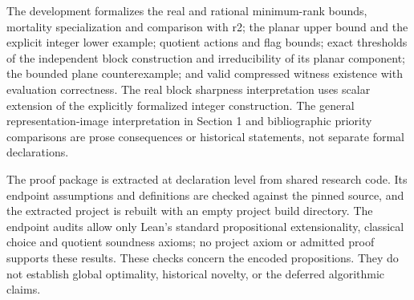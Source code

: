 The development formalizes the real and rational minimum-rank bounds, mortality specialization and comparison with r2; the planar upper bound and the explicit integer lower example; quotient actions and flag bounds; exact thresholds of the independent block construction and irreducibility of its planar component; the bounded plane counterexample; and valid compressed witness existence with evaluation correctness. The real block sharpness interpretation uses scalar extension of the explicitly formalized integer construction. The general representation-image interpretation in Section 1 and bibliographic priority comparisons are prose consequences or historical statements, not separate formal declarations.

The proof package is extracted at declaration level from shared research code. Its endpoint assumptions and definitions are checked against the pinned source, and the extracted project is rebuilt with an empty project build directory. The endpoint audits allow only Lean's standard propositional extensionality, classical choice and quotient soundness axioms; no project axiom or admitted proof supports these results. These checks concern the encoded propositions. They do not establish global optimality, historical novelty, or the deferred algorithmic claims.




